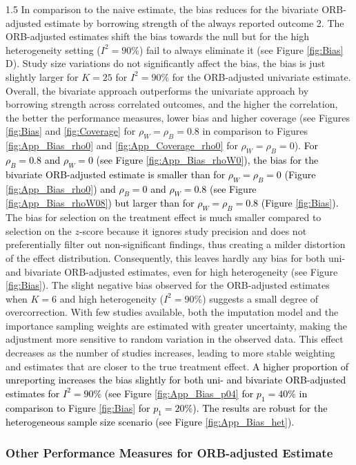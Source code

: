 \documentclass{article}
\newcommand{\mycolor}[1]{\textcolor{black}{#1}}
\begin{document}
\begin{spacing}{1.5}
\noindent
In comparison to the naive estimate, the bias reduces for the bivariate ORB-adjusted estimate by borrowing strength of the always reported outcome 2. The ORB-adjusted estimates shift the bias towards the null but for the high heterogeneity setting ($I^2 = 90\%$) fail to always eliminate it (see Figure \ref{fig:Bias} D). Study size variations do not significantly affect the bias, the bias is just slightly larger for $K = 25$ for $I^2 = 90\%$ for the ORB-adjusted univariate estimate. Overall, the bivariate approach outperforms the univariate approach by borrowing strength across correlated outcomes, and the higher the correlation, the better the performance measures, \ie lower bias and higher coverage (see Figures \ref{fig:Bias} and \ref{fig:Coverage} for $\rho_W = \rho_B = 0.8$ in comparison to Figures \ref{fig:App_Bias_rho0} and \ref{fig:App_Coverage_rho0} for $\rho_W = \rho_B = 0$). \mycolor{For $\rho_B = 0.8$ and $\rho_W = 0$ (see Figure \ref{fig:App_Bias_rhoW0}), the bias for the bivariate ORB-adjusted estimate is smaller than for $\rho_W = \rho_B = 0$ (Figure \ref{fig:App_Bias_rho0}) and $\rho_B = 0$ and $\rho_W = 0.8$ (see Figure \ref{fig:App_Bias_rhoW08}) but larger than for $\rho_W = \rho_B = 0.8$ (Figure \ref{fig:Bias}).} The bias for selection on the treatment effect is much smaller compared to selection on the $z$-score because it ignores study precision and does not preferentially filter out non-significant findings, thus creating a milder distortion of the effect distribution. Consequently, this leaves hardly any bias for both uni- and bivariate ORB-adjusted estimates, even for high heterogeneity (see Figure \ref{fig:Bias}).
The slight negative bias observed for the ORB-adjusted estimates when $K = 6$ and high heterogeneity ($I^2 = 90\%$) suggests a small degree of overcorrection. With few studies available, both the imputation model and the importance sampling weights are estimated with greater uncertainty, making the adjustment more sensitive to random variation in the observed data. This effect decreases as the number of studies increases, leading to more stable weighting and estimates that are closer to the true treatment effect. \mycolor{A higher proportion of unreporting increases the bias slightly for both uni- and bivariate ORB-adjusted estimates for $I^2 = 90\%$ (see Figure \ref{fig:App_Bias_p04} for $p_1 = 40\%$ in comparison to Figure \ref{fig:Bias} for $p_1 = 20\%$). The results are robust for the heterogeneous sample size scenario (see Figure \ref{fig:App_Bias_het}).}

\subsubsection{Other Performance Measures for ORB-adjusted Estimate}


\end{spacing}
\end{document}
